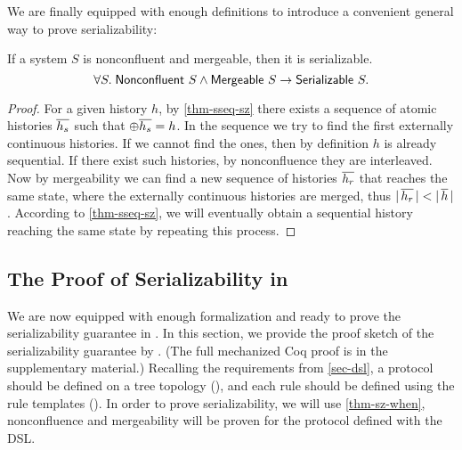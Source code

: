 \documentclass[sigplan,10pt,review,anonymous,screen]{acmart}\settopmatter{printfolios=true,printccs=false,printacmref=false}
\begin{document}
We are finally equipped with enough definitions to introduce a convenient general way to prove serializability:
\begin{theorem}
  If a system $S$ is nonconfluent and mergeable, then it is serializable.
  \begin{displaymath}
    \forall S.\; \mathsf{Nonconfluent}\ S \land \mathsf{Mergeable}\ S \to \mathsf{Serializable}\ S.
  \end{displaymath}
  \vspace{-15pt}
  \label{thm-sz-when}
\end{theorem}
\begin{proof}
  For a given history $h$, by \autoref{thm-sseq-sz} there exists a sequence of atomic histories $\overline{h_s}$ such that $\oplus \overline{h_s} = h$.
  In the sequence we try to find the first externally continuous histories.
  If we cannot find the ones, then by definition $h$ is already sequential.
  If there exist such histories, by nonconfluence they are interleaved.
  Now by mergeability we can find a new sequence of histories $\overline{h_r}$ that reaches the same state, where the externally continuous histories are merged, thus $|\, \overline{h_r}\, | < |\, \overline{h}\, |$.
  According to \autoref{thm-sseq-sz}, we will eventually obtain a sequential history reaching the same state by repeating this process.
\end{proof}

\subsection{The Proof of Serializability in \hemiola{}}

We are now equipped with enough formalization and ready to prove the serializability guarantee in \hemiola{}.
In this section, we provide the proof sketch of the serializability guarantee by \hemiola{}.
(The full mechanized Coq proof is in the supplementary material.)
Recalling the requirements from \autoref{sec-dsl}, a protocol should be defined on a tree topology (), and each rule should be defined using the rule templates ().
In order to prove serializability, we will use \autoref{thm-sz-when}, \ie{} nonconfluence and mergeability will be proven for the protocol defined with the \hemiola{} DSL.
\end{document}
